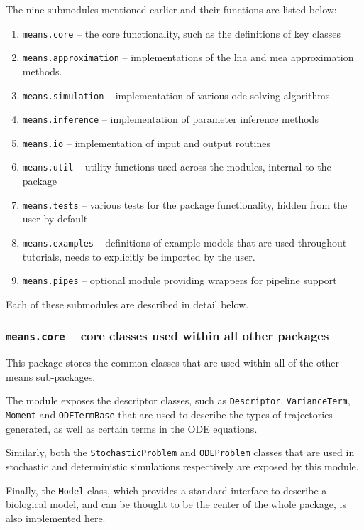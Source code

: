 The nine submodules mentioned earlier and their functions are listed below:
\begin{enumerate}
    \item \verb"means.core" -- the core functionality, such as the definitions of key classes
    \item \verb"means.approximation" -- implementations of the \gls{lna} and \gls{mea} approximation methods.
    
    \item \verb"means.simulation" -- implementation of various \gls{ode} solving algorithms.
    \item \verb"means.inference" -- implementation of parameter inference methods
    \item \verb"means.io" -- implementation of input and output routines
    \item \verb"means.util" -- utility functions used across the modules, internal to the package
    \item \verb"means.tests" -- various tests for the package functionality, hidden from the user by default
    \item \verb"means.examples" -- definitions of example models that are used throughout tutorials, needs to explicitly be imported by the user.
    \item \verb"means.pipes" -- optional module providing wrappers for pipeline support
\end{enumerate}

Each of these submodules are described in detail below.

\subsubsection{{\tt means.core} -- core classes used within all other packages}
This package stores the common classes that are used within all of the other means sub-packages.

The module exposes the descriptor classes, such as \verb"Descriptor",
\verb"VarianceTerm", \verb"Moment" and
\verb"ODETermBase" that are used to describe the types of trajectories generated,
as well as certain terms in the ODE equations.

Similarly, both the \verb"StochasticProblem" and
\verb"ODEProblem" classes that are used in stochastic and deterministic simulations respectively are exposed by this module.

Finally, the \verb"Model" class, which provides a standard interface to describe a biological model, and can be thought to be the center of the whole package, is also implemented here.